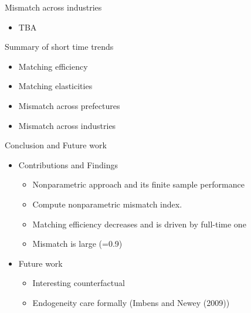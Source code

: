 \documentclass[aspectratio=169]{beamer}
\begin{document}
\begin{frame}{Mismatch across industries}
\begin{itemize}
    \item TBA
\end{itemize}
\end{frame}

\begin{frame}{Summary of short time trends}
    \begin{itemize}
        \item Matching efficiency
        \item Matching elasticities
        \item Mismatch across prefectures
        \item Mismatch across industries
    \end{itemize}
\end{frame}

\begin{frame}{Conclusion and Future work}
    \begin{itemize}
      \item Contributions and Findings
      \begin{itemize}
          \item Nonparametric approach and its finite sample performance
          \item Compute nonparametric mismatch index.
          \item Matching efficiency decreases and is driven by full-time one
          \item Mismatch is large (=0.9)
      \end{itemize}
      \item Future work
      \begin{itemize}
          \item Interesting counterfactual
          \item Endogeneity care formally (Imbens and Newey (2009))
      \end{itemize}
    \end{itemize}
\end{frame}
\end{document}
